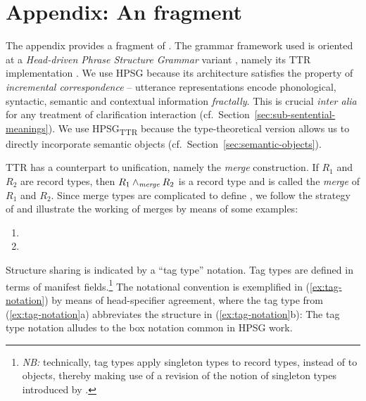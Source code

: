 \documentclass[output=paper
 	        ,biblatex
                ,babelshorthands
                ,newtxmath
                ,draftmode
                ,colorlinks, citecolor=brown
]{langscibook}
\begin{document}
\section*{Appendix: An \HPSGTTR fragment}

The appendix provides a fragment of \HPSGTTR.
%
The grammar framework used is oriented at a \textit{Head-driven Phrase Structure Grammar} variant \citep{Sag:Wasow:Bender:2003}, namely its TTR implementation \citep{Cooper:2008}.
%
We use HPSG because its  architecture satisfies the property of \emph{incremental correspondence} \citep{Johnson:Lappin:1999} -- utterance representations encode phonological, syntactic, semantic and contextual information \emph{fractally}.
%
 This is crucial {\it inter alia} for any treatment of clarification interaction (cf.\ Section~\ref{sec:sub-sentential-meanings}). 
%
We use HPSG\textsubscript{TTR} because the type-theoretical version allows us to directly incorporate semantic objects (cf.\ Section~\ref{sec:semantic-objects}).


TTR has a counterpart to unification, namely the \emph{merge} construction.
%
\ea
\ea If $R_1$ and $R_2$ are record types, then $R_1 \wedge_{\textit{merge}} R_2$ is a record type and is called the \emph{merge} of $R_1$ and $R_2$.
\ex Since merge types are complicated to define \citep[but see][]{Cooper:2012}, we follow the strategy of \citet{Cooper:2017:a} and illustrate the working of merges by means of some examples:
\begin{enumerate}[label=(\roman*), leftmargin=6.5em]
\item 
\avm{
[a & : T \\
b & : R]
\ttrmerge
[c & : S]
=
[a & : T \\
b & : R \\
c & : S]
}
\item 
\avm{
[a & : T ]
\ttrmerge
[a & : R]
=
[a & : T \ttrmerge\ R]
}
\end{enumerate}
\z
\z


Structure sharing is indicated by a \enquote{tag type} notation.
%
Tag types are defined in terms of manifest fields.\footnote{\textit{NB:} technically, tag types apply singleton types to record types, instead of to objects, thereby making use of a revision of the notion of singleton types introduced by \citet[4, footnote~3]{Cooper:2013}.}
%
The notational convention is exemplified in (\ref{ex:tag-notation}) by means of head-specifier agreement, where the tag type from (\ref{ex:tag-notation}a) abbreviates the structure in (\ref{ex:tag-notation}b):
%
\ea \label{ex:tag-notation}
\ea
{}
\ex 
{}
\z
\z 
%
The tag type notation alludes to the box notation common in HPSG work.
\end{document}
